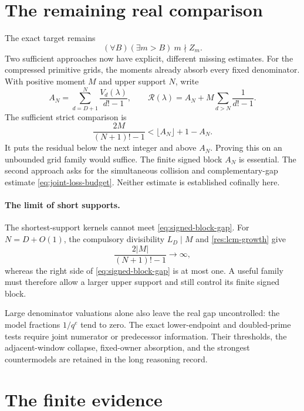 \documentclass[11pt]{article}
\begin{document}
\section{The remaining real comparison}\label{sec:open}\label{sec:plateau}

The exact target remains
\begin{equation}
(\forall B)(\exists m>B)\ m\nmid Z_m.
\label{eq:canonical-open-target}
\end{equation}
Two sufficient approaches now have explicit, different missing estimates.
For the compressed primitive grids, the moments already absorb every fixed
denominator.  With positive moment $M$ and upper support $N$, write
\[
A_N=\sum_{d=D+1}^N\frac{V_d(\lambda)}{d!-1},\qquad
\mathcal R(\lambda)=A_N+M\sum_{d>N}\frac1{d!-1}.
\]
The sufficient strict comparison is
\begin{equation}
\frac{2M}{(N+1)!-1}<\lfloor A_N\rfloor+1-A_N.
\label{eq:signed-block-gap}
\end{equation}
It puts the residual below the next integer and above $A_N$.  Proving this
on an unbounded grid family would suffice.  The finite signed block $A_N$
is essential.  The second approach asks for the simultaneous collision and
complementary-gap estimate \eqref{eq:joint-loss-budget}.
Neither estimate is established cofinally here.

\paragraph{The limit of short supports.}
\label{sec:nogo}\label{sec:adjacent-unit-no-go}
The shortest-support kernels cannot meet \eqref{eq:signed-block-gap}.
For $N=D+O(1)$, the compulsory divisibility $L_D\mid M$ and
\eqref{res:lcm-growth} give
\[
\frac{2|M|}{(N+1)!-1}\longrightarrow\infty,
\]
whereas the right side of \eqref{eq:signed-block-gap} is at most one.
A useful family must therefore allow a larger upper support and still
control its finite signed block.

Large denominator valuations alone also leave the real gap uncontrolled:
the model fractions $1/q^e$ tend to zero.  The exact lower-endpoint and
doubled-prime tests require joint numerator or predecessor information.
Their thresholds, the adjacent-window collapse, fixed-owner absorption,
and the strongest countermodels are retained in the long reasoning record.

\section{The finite evidence}\label{sec:finite}
\end{document}
